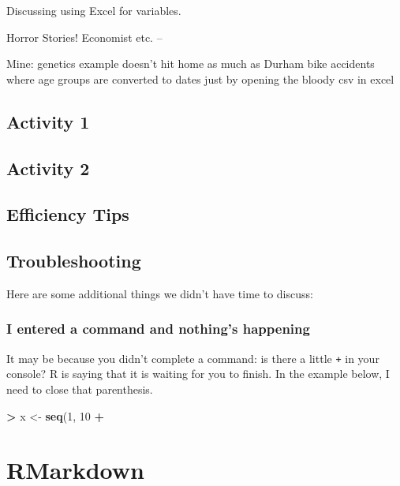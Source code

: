 \documentclass[]{book}
\newenvironment{Shaded}{\begin{snugshade}}{\end{snugshade}}
\newcommand{\DecValTok}[1]{\textcolor[rgb]{0.00,0.00,0.81}{#1}}
\newcommand{\KeywordTok}[1]{\textcolor[rgb]{0.13,0.29,0.53}{\textbf{#1}}}
\newcommand{\NormalTok}[1]{#1}
\newcommand{\OperatorTok}[1]{\textcolor[rgb]{0.81,0.36,0.00}{\textbf{#1}}}
\newcommand{\StringTok}[1]{\textcolor[rgb]{0.31,0.60,0.02}{#1}}
\begin{document}
Discussing using Excel for variables.

Horror Stories! Economist etc. --

Mine: genetics example doesn't hit home as much as Durham bike accidents where age groups are converted to dates just by opening the bloody csv in excel

\hypertarget{activity-1}{%
\section{Activity 1}\label{activity-1}}

\hypertarget{activity-2}{%
\section{Activity 2}\label{activity-2}}

\hypertarget{efficiency-tips}{%
\section{Efficiency Tips}\label{efficiency-tips}}

\hypertarget{troubleshooting}{%
\section{Troubleshooting}\label{troubleshooting}}

Here are some additional things we didn't have time to discuss:

\hypertarget{i-entered-a-command-and-nothings-happening}{%
\subsection{I entered a command and nothing's happening}\label{i-entered-a-command-and-nothings-happening}}

It may be because you didn't complete a command: is there a little \texttt{+} in your console? R is saying that it is waiting for you to finish. In the example below, I need to close that parenthesis.

\begin{Shaded}
\begin{Highlighting}[]
\OperatorTok{>}\StringTok{ }\NormalTok{x <-}\StringTok{ }\KeywordTok{seq}\NormalTok{(}\DecValTok{1}\NormalTok{, }\DecValTok{10}
\OperatorTok{+}\StringTok{ }
\end{Highlighting}
\end{Shaded}

\hypertarget{rmarkdown}{%
\chapter{RMarkdown}\label{rmarkdown}}
\end{document}
